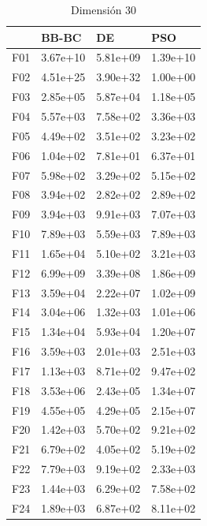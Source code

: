 \begin{table}[H]
\begin{minipage}{.5\linewidth}
    \end{minipage}%
    \begin{minipage}{.5\linewidth}
      \centering
        \caption{Dimensión 30}
        \begin{tabular}{llll}
            \toprule
            {} &     BB-BC &        DE &       PSO \\
            \midrule
            F01  &  3.67e+10 &  5.81e+09 &  1.39e+10 \\
            F02  &  4.51e+25 &  3.90e+32 &  1.00e+00 \\
            F03  &  2.85e+05 &  5.87e+04 &  1.18e+05 \\
            F04  &  5.57e+03 &  7.58e+02 &  3.36e+03 \\
            F05  &  4.49e+02 &  3.51e+02 &  3.23e+02 \\
            F06  &  1.04e+02 &  7.81e+01 &  6.37e+01 \\
            F07  &  5.98e+02 &  3.29e+02 &  5.15e+02 \\
            F08  &  3.94e+02 &  2.82e+02 &  2.89e+02 \\
            F09  &  3.94e+03 &  9.91e+03 &  7.07e+03 \\
            F10  &  7.89e+03 &  5.59e+03 &  7.89e+03 \\
            F11  &  1.65e+04 &  5.10e+02 &  3.21e+03 \\
            F12  &  6.99e+09 &  3.39e+08 &  1.86e+09 \\
            F13  &  3.59e+04 &  2.22e+07 &  1.02e+09 \\
            F14  &  3.04e+06 &  1.32e+03 &  1.01e+06 \\
            F15  &  1.34e+04 &  5.93e+04 &  1.20e+07 \\
            F16  &  3.59e+03 &  2.01e+03 &  2.51e+03 \\
            F17  &  1.13e+03 &  8.71e+02 &  9.47e+02 \\
            F18  &  3.53e+06 &  2.43e+05 &  1.34e+07 \\
            F19  &  4.55e+05 &  4.29e+05 &  2.15e+07 \\
            F20  &  1.42e+03 &  5.70e+02 &  9.21e+02 \\
            F21  &  6.79e+02 &  4.05e+02 &  5.19e+02 \\
            F22  &  7.79e+03 &  9.19e+02 &  2.33e+03 \\
            F23  &  1.44e+03 &  6.29e+02 &  7.58e+02 \\
            F24  &  1.89e+03 &  6.87e+02 &  8.11e+02 \\

\end{tabular}
\end{minipage}
\end{table}
